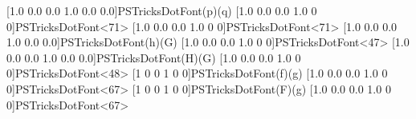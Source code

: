   [1.0 0.0 0.0 1.0 0.0 0.0]{PSTricksDotFont}{(p)}{(q)}
  [1.0 0.0 0.0 1.0 0 0]{PSTricksDotFont}{<71>}
  [1.0 0.0 0.0 1.0 0 0]{PSTricksDotFont}{<71>}
% 
  [1.0 0.0 0.0 1.0 0.0 0.0]{PSTricksDotFont}{(h)}{(G)}
  [1.0 0.0 0.0 1.0 0 0]{PSTricksDotFont}{<47>}
  [1.0 0.0 0.0 1.0 0.0 0.0]{PSTricksDotFont}{(H)}{(G)}
  [1.0 0.0 0.0 1.0 0 0]{PSTricksDotFont}{<48>}
%
  [1 0 0 1 0 0]{PSTricksDotFont}{(f)}{(g)}
  [1.0 0.0 0.0 1.0 0 0]{PSTricksDotFont}{<67>}
  [1 0 0 1 0 0]{PSTricksDotFont}{(F)}{(g)}
  [1.0 0.0 0.0 1.0 0 0]{PSTricksDotFont}{<67>}
\endinput
